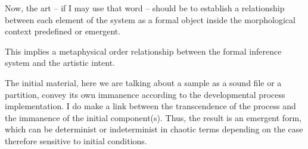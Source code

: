 {Now, the art -- if I may use that word -- should be to establish a relationship between each element of the system as a formal object inside the morphological context predefined or emergent.

This implies a metaphysical order relationship between the formal inference system and the artistic intent.}

{The initial material, here we are talking about a sample as a sound file or a partition, convey its own immanence according to the developmental process implementation. I do make a link between the transcendence of the process and the immanence of the initial component(s). Thus, the result is an emergent form, which can be determinist or indeterminist in chaotic terms \citep{tdc} depending on the case therefore sensitive to initial conditions.}
